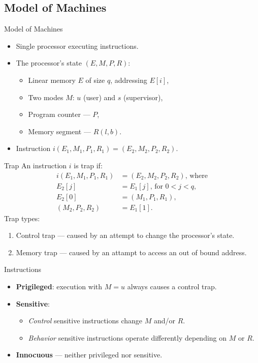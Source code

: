 \subsection{Model of Machines}

\begin{frame}{Model of Machines}
\begin{itemize}
\item Single processor executing instructions.
\item The processor's state $(E, M, P, R)$:
  \begin{itemize}
  \item Linear memory $E$ of size $q$, addressing $E[i]$,
  \item Two modes $M$: $u$ (user) and $s$ (supervisor),
  \item Program counter --- $P$,
  \item Memory segment --- $R (l, b)$.
  \end{itemize}
\item Instruction $i(E_1, M_1, P_1, R_1) = (E_2, M_2, P_2, R_2)$.
\end{itemize}
\end{frame}

\begin{frame}{Trap}
An instruction $i$ is trap if:
\begin{equation*}
  \begin{aligned}
  i(E_1, M_1, P_1, R_1) &= (E_2, M_2, P_2, R_2)\text{, where} \\
  E_2[j] &= E_1[j]\text{, for } 0 < j < q, \\
  E_2[0] &= (M_1, P_1, R_1), \\
  (M_2, P_2, R_2) &= E_1[1].
  \end{aligned}
\end{equation*}
\pause\vfill
Trap types:
\begin{enumerate}
\item Control trap --- caused by an attempt to change the processor's state.
\item Memory trap --- caused by an attampt to access an out of bound address.
\end{enumerate}
\end{frame}

\begin{frame}{Instructions}
\begin{itemize}
\item \textbf{Prigileged}: execution with $M=u$ always causes a
  control trap.\pause
\item \textbf{Sensitive}:
  \begin{itemize}
  \item \textit{Control} sensitive instructions change $M$ and/or $R$.
  \item \textit{Behavior} sensitive instructions operate differently depending
    on $M$ or $R$.\pause
  \end{itemize}
  \item \textbf{Innocuous} --- neither privileged nor sensitive.
\end{itemize}
\end{frame}


